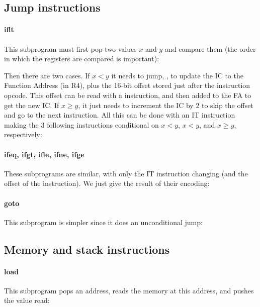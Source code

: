 
\subsection{Jump instructions}

\paragraph{iflt} This subprogram must first pop two values $x$ and $y$ and
compare them (the order in which the registers are compared is important):


\noindent Then there are two cases. If $x<y$ it needs to jump, \ie, to update
the IC to the Function Address (in R4), plus the 16-bit offset stored just
after the instruction opcode. This offset can be read with a 
instruction, and then added to the FA to get the new IC. If $x \ge y$, it just
needs to increment the IC by 2 to skip the offset and go to the next
instruction. All this can be done with an IT instruction making the 3 following
instructions conditional on $x<y$, $x<y$, and $x \ge y$, respectively:


\paragraph{ifeq, ifgt, ifle, ifne, ifge} These subprograms are similar, with
only the IT instruction changing (and the offset of the  instruction).
We just give the result of their encoding:


\paragraph{goto} This subprogram is simpler since it does an unconditional jump:


\subsection{Memory and stack instructions}

\paragraph{load} This subprogram pops an address, reads the memory at this
address, and pushes the value read:

